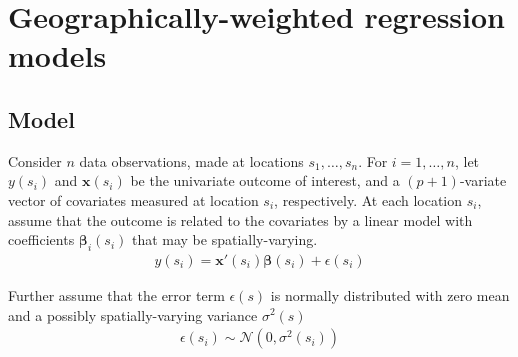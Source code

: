 \documentclass[authoryear, review, 11pt]{elsarticle}
\begin{document}
	

	
\section{Geographically-weighted regression models \label{section:model}}

	\subsection{Model}
	Consider $n$ data observations, made at locations $s_1, \dots, s_n$. For $i = 1, \dots, n$, let $y(s_i)$ and $\bm{x}(s_i)$ be the univariate outcome of interest, and a $(p+1)$-variate vector of covariates measured at location $s_i$, respectively. At each location $s_i$, assume that the outcome is related to the covariates by a linear model with coefficients $\bm{\beta}_i(s_i)$ that may be spatially-varying.
	\begin{eqnarray}
		y(s_i) = \bm{x}'(s_i) \bm{\beta}(s_i) + \epsilon(s_i)
	\label{eq:lm(s)}
	\end{eqnarray}
	
	Further assume that the error term $\epsilon(s)$ is normally distributed with zero mean and a possibly spatially-varying variance $\sigma^2(s)$
	\begin{eqnarray}
		\epsilon(s_i) \sim \mathcal{N} \left( 0,\sigma^2(s_i) \right)
	\label{eq:err}
	\end{eqnarray}
	
\end{document}
